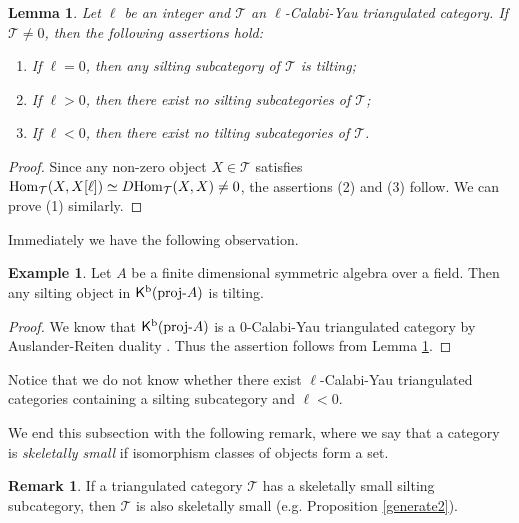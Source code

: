 \documentclass[a4paper,reqno]{amsart}
\newtheorem{lemma}[theorem]{Lemma}
\theoremstyle{definition}
\newtheorem{remark}[theorem]{Remark}
\newtheorem{example}[theorem]{Example}
\newcommand{\TT}{{\mathcal T}}
\newcommand{\proj}[1]{{\rm{proj}}\text{-}#1} %
\newcommand{\homo}[3]{{\rm{Hom}}_{#1}(#2, #3)} %
\newcommand{\K}{\mathsf{K}}
\begin{document}
\begin{lemma}\label{prop:CY}
Let $\ell$ be an integer and $\TT$ an $\ell$-Calabi-Yau triangulated category.
If $\TT\neq0$, then the following assertions hold:
\begin{enumerate}[$(1)$]
\item If $\ell=0$, then any silting subcategory of $\TT$ is tilting; 
\item If $\ell>0$, then there exist no silting subcategories of $\TT$;
\item If $\ell<0$, then there exist no tilting subcategories of $\TT$.
\end{enumerate}
\end{lemma}

\begin{proof}
Since any non-zero object $X\in\TT$ satisfies $\homo{\TT}{X}{X[\ell]}\simeq D\homo{\TT}{X}{X}\neq0$,
the assertions (2) and (3) follow. We can prove (1) similarly.
\end{proof}

Immediately we have the following observation.

\begin{example}
Let $A$ be a finite dimensional symmetric algebra over a field.
Then any silting object in $\K^{\rm b}(\proj A)$ is tilting.
\end{example}

\begin{proof}
We know that $\K^{\rm b}(\proj A)$ is a 0-Calabi-Yau triangulated category by Auslander-Reiten duality
\cite{H}. Thus the assertion follows from Lemma \ref{prop:CY}.
\end{proof}

Notice that we do not know whether there exist $\ell$-Calabi-Yau triangulated categories
containing a silting subcategory and $\ell<0$.

We end this subsection with the following remark, where we say that a category
is \emph{skeletally small} if isomorphism classes of objects form a set.

\begin{remark}\label{T is small}
If a triangulated category $\TT$ has a skeletally small silting subcategory,
then $\TT$ is also skeletally small (e.g. Proposition \ref{generate2}).
\end{remark}


\end{document}
